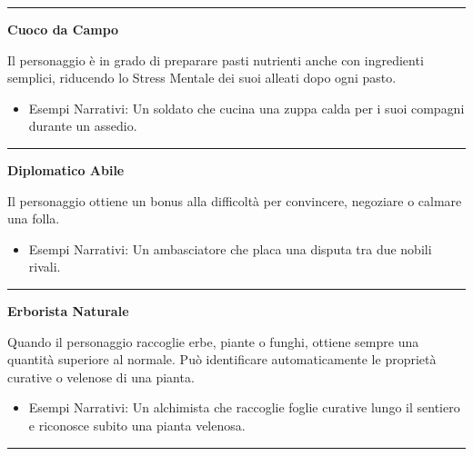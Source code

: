 \documentclass[../manuale_main.tex]{subfiles}
\begin{document}
\vspace{0.5cm}\rule{\textwidth}{0.4pt}\vspace{1cm}

\begin{center}
\textbf{\large{Cuoco da Campo}}\\
\end{center}
Il personaggio è in grado di preparare pasti nutrienti anche con ingredienti semplici, riducendo lo Stress Mentale dei suoi alleati dopo ogni pasto.

\begin{itemize}
\item Esempi Narrativi: Un soldato che cucina una zuppa calda per i suoi compagni durante un assedio.
\end{itemize}

\vspace{0.5cm}\rule{\textwidth}{0.4pt}\vspace{1cm}

\begin{center}
\textbf{\large{Diplomatico Abile}}\\
\end{center}
Il personaggio ottiene un bonus alla difficoltà per convincere, negoziare o calmare una folla.

\begin{itemize}
\item Esempi Narrativi: Un ambasciatore che placa una disputa tra due nobili rivali.
\end{itemize}

\vspace{0.5cm}\rule{\textwidth}{0.4pt}\vspace{1cm}

\begin{center}
\textbf{\large{Erborista Naturale}}\\
\end{center}
Quando il personaggio raccoglie erbe, piante o funghi, ottiene sempre una quantità superiore al normale. Può identificare automaticamente le proprietà curative o velenose di una pianta.

\begin{itemize}
\item Esempi Narrativi: Un alchimista che raccoglie foglie curative lungo il sentiero e riconosce subito una pianta velenosa.
\end{itemize}

\vspace{0.5cm}\rule{\textwidth}{0.4pt}\vspace{1cm}
\end{document}

